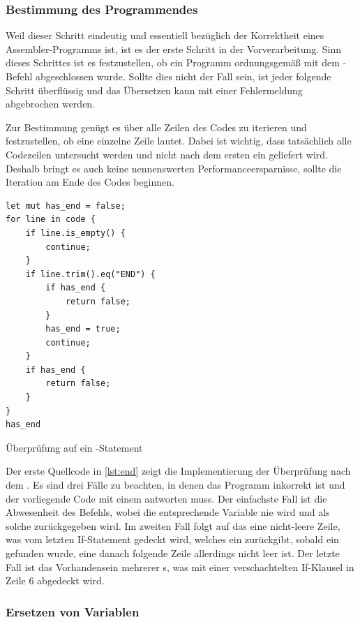 \subsubsection{Bestimmung des Programmendes}

Weil dieser Schritt eindeutig und essentiell bezüglich der Korrektheit eines Assembler-Programms ist, ist es der erste Schritt in der Vorverarbeitung. Sinn dieses Schrittes ist es festzustellen, ob ein Programm ordnungsgemäß mit dem -Befehl abgeschlossen wurde. Sollte dies nicht der Fall sein, ist jeder folgende Schritt überflüssig und das Übersetzen kann mit einer Fehlermeldung abgebrochen werden.

Zur Bestimmung genügt es über alle Zeilen des Codes zu iterieren und festzustellen, ob eine einzelne Zeile  lautet. Dabei ist wichtig, dass tatsächlich alle Codezeilen untersucht werden und nicht nach dem ersten  ein  geliefert wird. Deshalb bringt es auch keine nennenswerten Performanceersparnisse, sollte die Iteration am Ende des Codes beginnen. 

\begin{listing}[th]
\begin{verbatim}
let mut has_end = false;
for line in code {
    if line.is_empty() {
        continue;
    }
    if line.trim().eq("END") {
        if has_end {
            return false;
        }
        has_end = true;
        continue;
    }
    if has_end {
        return false;
    }
}
has_end
\end{verbatim}
\label{lst:end}
\caption{Überprüfung auf ein -Statement}
\end{listing}

Der erste Quellcode in \ref{lst:end} zeigt die Implementierung der Überprüfung nach dem . Es sind drei Fälle zu beachten, in denen das Programm inkorrekt ist und der vorliegende Code mit einem  antworten muss. Der einfachste Fall ist die Abwesenheit des Befehls, wobei die entsprechende Variable nie  wird und als solche zurückgegeben wird. Im zweiten Fall folgt auf das  eine nicht-leere Zeile, was vom letzten If-Statement gedeckt wird, welches ein  zurückgibt, sobald ein  gefunden wurde, eine danach folgende Zeile allerdings nicht leer ist. Der letzte Fall ist das Vorhandensein mehrerer s, was mit einer verschachtelten If-Klausel in Zeile 6 abgedeckt wird.

\subsubsection{Ersetzen von Variablen}\label{chap:var-replacement}

